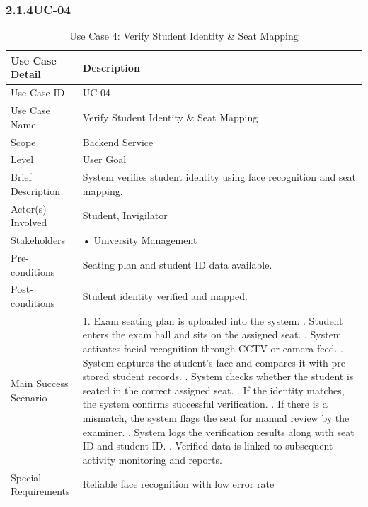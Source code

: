 \clearpage

\subsubsection*{2.1.4\quad UC-04}
\begin{longtable}{|p{5cm}|p{10cm}|}
\caption{Use Case 4: Verify Student Identity \& Seat Mapping}\label{uc1} \\
\hline
\textbf{Use Case Detail} & \textbf{Description} \\ \hline
Use Case ID & UC-04 \\ \hline
Use Case Name & Verify Student Identity \& Seat Mapping \\ \hline
Scope & Backend Service \\ \hline
Level & User Goal \\ \hline
Brief Description & System verifies student identity using face recognition and seat mapping. \\ \hline
Actor(s) Involved & Student, Invigilator \\ \hline
Stakeholders & • University Management \\ \hline
Pre-conditions & Seating plan and student ID data available. \\ \hline
Post-conditions & Student identity verified and mapped. \\ \hline
Main Success Scenario & 
1. Exam seating plan is uploaded into the system. \newline
2. Student enters the exam hall and sits on the assigned seat. \newline
3. System activates facial recognition through CCTV or camera feed. \newline
4. System captures the student’s face and compares it with pre-stored student records. \newline
5. System checks whether the student is seated in the correct assigned seat. \newline
6. If the identity matches, the system confirms successful verification. \newline
7. If there is a mismatch, the system flags the seat for manual review by the examiner. \newline
8. System logs the verification results along with seat ID and student ID. \newline
9. Verified data is linked to subsequent activity monitoring and reports. \\ \hline
Special Requirements & Reliable face recognition with low error rate \\ \hline


\end{longtable}

